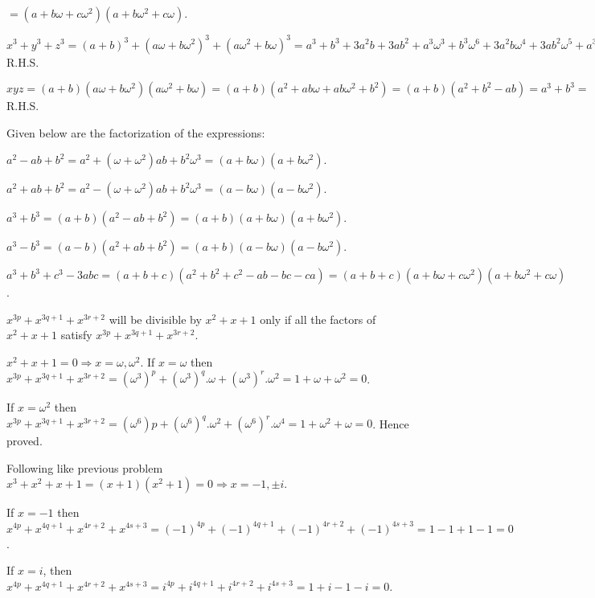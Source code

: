   $= (a + b\omega + c\omega^2)(a + b\omega^2 + c\omega)$.
\item $x^3 + y^3 + z^3 = (a + b)^3 + (a\omega + b\omega^2)^3 + (a\omega^2 + b\omega)^3 = a^3 + b^3 + 3a^2b +
  3ab^2 + a^3\omega^3 + b^3\omega^6 + 3a^2b\omega^4 + 3ab^2\omega^5 + a^3\omega^6 + b^3\omega^3 +
  3a^2b\omega^5 + 3ab^2\omega^4 = 3[a^3 + b^3 + 3a^2b(1 + \omega + \omega^2) + 3ab^2(1 + \omega + \omega^2)]
  = 3(a^3 + b^3) = $R.H.S.

  $xyz = (a + b)(a\omega + b\omega^2)(a\omega^2 + b\omega) = (a + b)(a^2 + ab\omega + ab\omega^2 + b^2) = (a
  + b)(a^2 + b^2 - ab) = a^3 + b^3 =$ R.H.S.
\item Given below are the factorization of the expressions:
  \startitemize[i]
  \item $a^2 - ab + b^2 = a^2 + (\omega + \omega^2)ab + b^2\omega^3 = (a + b\omega)(a + b\omega^2)$.
  \item $a^2 + ab + b^2 = a^2 - (\omega + \omega^2)ab + b^2\omega^3 = (a - b\omega)(a - b\omega^2)$.
  \item $a^3 + b^3 = (a + b)(a^2 - ab + b^2) = (a + b)(a + b\omega)(a + b\omega^2)$.
  \item $a^3 - b^3 = (a - b)(a^2 + ab + b^2) = (a + b)(a - b\omega)(a - b\omega^2)$.
  \item $a^3 + b^3 + c^3 - 3abc = (a + b + c)(a^2 + b^2 + c^2 - ab - bc - ca) = (a + b + c)(a + b\omega +
    c\omega^2)(a + b\omega^2 + c\omega)$.
  \stopitemize
\item $x^{3p} + x^{3q + 1} + x^{3r + 2}$ will be divisible by $x^2 + x + 1$ only if all the factors of $x^2
  + x + 1$ satisfy $x^{3p} + x^{3q + 1} + x^{3r + 2}$.

  $x^2 + x + 1 = 0\Rightarrow x = \omega, \omega^2$. If $x = \omega$ then $x^{3p} + x^{3q + 1} + x^{3r + 2}
  = (\omega^3)^p + (\omega^3)^q.\omega + (\omega^3)^r.\omega^2 = 1 + \omega + \omega^2 = 0$.

  If $x = \omega^2$ then $x^{3p} + x^{3q + 1} + x^{3r + 2} = (\omega^6)p + (\omega^6)^q.\omega^2 +
  (\omega^6)^r.\omega^4 = 1 + \omega^2 + \omega = 0$. Hence proved.
\item Following like previous problem $x^3 + x^2 + x + 1 = (x + 1)(x^2 + 1) = 0 \Rightarrow x = -1, \pm i$.

  If $x = -1$ then $x^{4p} + x^{4q + 1} + x^{4r + 2} + x^{4s + 3} = (-1)^{4p} + (-1)^{4q + 1} + (-1)^{4r +
    2} + (-1)^{4s + 3} = 1 - 1 + 1 - 1 = 0$.

  If $x = i$, then $x^{4p} + x^{4q + 1} + x^{4r + 2} + x^{4s + 3} = i^{4p} + i^{4q + 1} + i^{4r + 2} + i^{4s
    + 3} = 1 + i - 1 - i = 0$.

